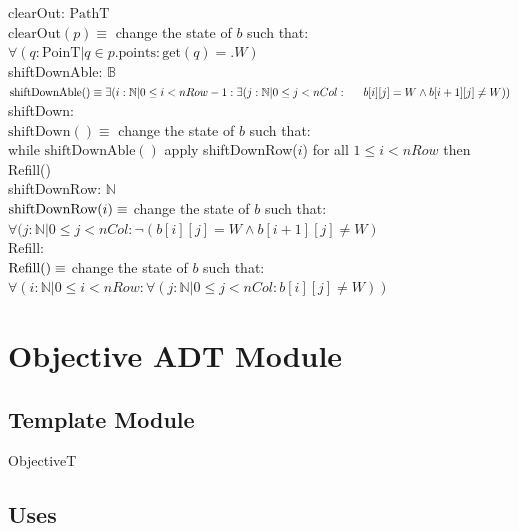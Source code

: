 \documentclass[12pt]{article}
\begin{document}
\noindent clearOut: $\mbox{PathT}$\\
\noindent $\mbox{clearOut}(p) \equiv $ change the state of $b$ such that: \\
$\forall (q : \mbox{PoinT} | q \in p.\mbox{points} : \mbox{get}(q) = .W)$\\

\noindent shiftDownAble: $\mathbb{B}$\\
\noindent $\mbox{shiftDownAble}() \equiv \exists (i : \mathbb{N} | 0 \le i < nRow - 1 : \exists(j : \mathbb{N} | 0 \le j < nCol : \\
\indent b[i][j] = W \land b[i+1][j] \neq W)) $\\

\noindent shiftDown:\\
\noindent $\mbox{shiftDown}() \equiv $ change the state of $b$ such that: \\
while $\mbox{shiftDownAble}() $ apply shiftDownRow($i$) for all $1 \le i < nRow $ then Refill() \\

\noindent shiftDownRow: $\mathbb{N}$\\
$\noindent \mbox{shiftDownRow}(i) \equiv $ change the state of $b$ such that: \\
$\forall(j : \mathbb{N} | 0 \le j < nCol: \lnot (b[i][j] = W \land b[i+1][j] \neq W)$ \\


\noindent Refill: \\
$\noindent \mbox{Refill}() \equiv $ change the state of $b$ such that: \\
$\forall (i : \mathbb{N} | 0 \le i < nRow : \forall (j : \mathbb{N} | 0 \le j < nCol : b[i][j] \neq W))$ \\

\newpage

\section* {Objective ADT Module}

\subsection*{Template Module}

ObjectiveT

\subsection* {Uses}
\end{document}
